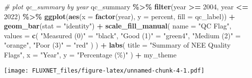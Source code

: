 \documentclass[
]{article}
\newenvironment{Shaded}{\begin{snugshade}}{\end{snugshade}}
\newcommand{\AttributeTok}[1]{\textcolor[rgb]{0.13,0.29,0.53}{#1}}
\newcommand{\CommentTok}[1]{\textcolor[rgb]{0.56,0.35,0.01}{\textit{#1}}}
\newcommand{\DecValTok}[1]{\textcolor[rgb]{0.00,0.00,0.81}{#1}}
\newcommand{\FunctionTok}[1]{\textcolor[rgb]{0.13,0.29,0.53}{\textbf{#1}}}
\newcommand{\NormalTok}[1]{#1}
\newcommand{\OtherTok}[1]{\textcolor[rgb]{0.56,0.35,0.01}{#1}}
\newcommand{\SpecialCharTok}[1]{\textcolor[rgb]{0.81,0.36,0.00}{\textbf{#1}}}
\newcommand{\StringTok}[1]{\textcolor[rgb]{0.31,0.60,0.02}{#1}}
\begin{document}
\begin{Shaded}
\begin{Highlighting}[]
\CommentTok{\# plot qc\_summary by year}
\NormalTok{qc\_summary }\SpecialCharTok{\%\textgreater{}\%}
  \FunctionTok{filter}\NormalTok{(year }\SpecialCharTok{\textgreater{}=} \DecValTok{2004}\NormalTok{, year }\SpecialCharTok{\textless{}=} \DecValTok{2022}\NormalTok{) }\SpecialCharTok{\%\textgreater{}\%}
  \FunctionTok{ggplot}\NormalTok{(}\FunctionTok{aes}\NormalTok{(}\AttributeTok{x =} \FunctionTok{factor}\NormalTok{(year), }\AttributeTok{y =}\NormalTok{ percent, }\AttributeTok{fill =}\NormalTok{ qc\_label)) }\SpecialCharTok{+}
  \FunctionTok{geom\_bar}\NormalTok{(}\AttributeTok{stat =} \StringTok{"identity"}\NormalTok{) }\SpecialCharTok{+}
  \FunctionTok{scale\_fill\_manual}\NormalTok{(}
    \AttributeTok{name =} \StringTok{"QC Flag"}\NormalTok{,}
    \AttributeTok{values =} \FunctionTok{c}\NormalTok{(}
      \StringTok{"Measured (0)"} \OtherTok{=} \StringTok{"black"}\NormalTok{,}
      \StringTok{"Good (1)"} \OtherTok{=} \StringTok{"green4"}\NormalTok{,}
      \StringTok{"Medium (2)"} \OtherTok{=} \StringTok{"orange"}\NormalTok{,}
      \StringTok{"Poor (3)"} \OtherTok{=} \StringTok{"red"}
\NormalTok{    )}
\NormalTok{  ) }\SpecialCharTok{+}
  \FunctionTok{labs}\NormalTok{(}
    \AttributeTok{title =} \StringTok{"Summary of NEE Quality Flags"}\NormalTok{,}
    \AttributeTok{x =} \StringTok{"Year"}\NormalTok{, }\AttributeTok{y =} \StringTok{"Percentage (\%)"}
\NormalTok{  ) }\SpecialCharTok{+}\NormalTok{ my\_theme}
\end{Highlighting}
\end{Shaded}

\texttt{[image: FLUXNET\_files/figure-latex/unnamed-chunk-4-1.pdf]}
\end{document}
